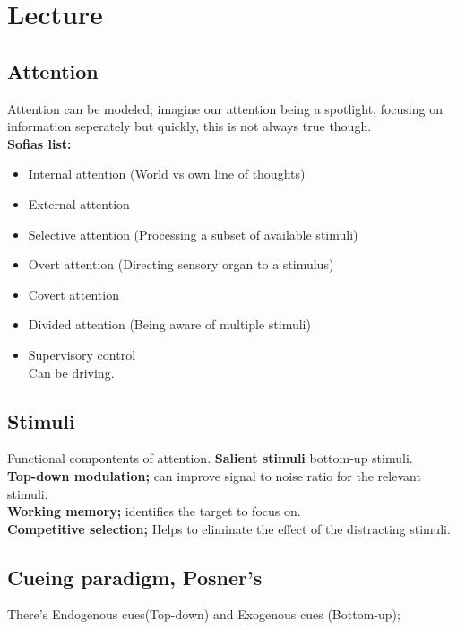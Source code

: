 \documentclass{article}
\begin{document}
\section{Lecture}
\subsection{Attention}
Attention can be modeled; imagine our attention being a spotlight, focusing on information seperately but quickly, this is not always true though.\\
\textbf{Sofias list:}\\
\begin{itemize}
  \item Internal attention (World vs own line of thoughts)
  \item External attention
  \item Selective attention (Processing a subset of available stimuli)
  \item Overt attention (Directing sensory organ to a stimulus)
  \item Covert attention
  \item Divided attention (Being aware of multiple stimuli)
\end{itemize}
\begin{itemize}
  \item Supervisory control\\
    Can be driving.
\end{itemize}
\subsection{Stimuli}
Functional compontents of attention.
\textbf{Salient stimuli} bottom-up stimuli.\\
\textbf{Top-down modulation;} can improve signal to noise ratio for the relevant stimuli.\\
\textbf{Working memory;} identifies the target to focus on.\\
\textbf{Competitive selection;} Helps to eliminate the effect of the distracting stimuli.\\
\subsection{Cueing paradigm, Posner's}
There's Endogenous cues(Top-down) and Exogenous cues (Bottom-up);\\
\end{document}
